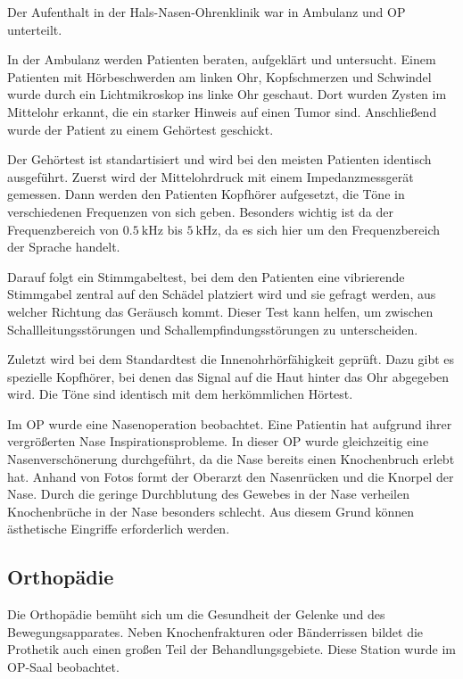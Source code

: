 \documentclass[11pt,a4paper,titlepage]{scrartcl}
\begin{document}
Der Aufenthalt in der Hals-Nasen-Ohrenklinik war in Ambulanz und OP unterteilt. \medskip

In der Ambulanz werden Patienten beraten, aufgeklärt und untersucht.
Einem Patienten mit Hörbeschwerden am linken Ohr, Kopfschmerzen und Schwindel wurde durch ein Lichtmikroskop ins linke Ohr geschaut.
Dort wurden Zysten im Mittelohr erkannt, die ein starker Hinweis auf einen Tumor sind.
Anschließend wurde der Patient zu einem Gehörtest geschickt. \medskip

Der Gehörtest ist standartisiert und wird bei den meisten Patienten identisch ausgeführt.
Zuerst wird der Mittelohrdruck mit einem Impedanzmessgerät gemessen.
Dann werden den Patienten Kopfhörer aufgesetzt, die Töne in verschiedenen Frequenzen von sich geben.
Besonders wichtig ist da der Frequenzbereich von $\SI{0,5}{\kilo\hertz}$ bis $\SI{5}{\kilo\hertz}$, da es sich hier um den Frequenzbereich der Sprache handelt. \medskip

Darauf folgt ein Stimmgabeltest, bei dem den Patienten eine vibrierende Stimmgabel zentral auf den Schädel platziert wird und sie gefragt werden, aus welcher Richtung das Geräusch kommt.
Dieser Test kann helfen, um zwischen Schallleitungsstörungen und Schallempfindungsstörungen zu unterscheiden. \medskip

Zuletzt wird bei dem Standardtest die Innenohrhörfähigkeit geprüft. Dazu gibt es spezielle Kopfhörer, bei denen das Signal auf die Haut hinter das Ohr abgegeben wird. Die Töne sind identisch mit dem herkömmlichen Hörtest. \medskip

Im OP wurde eine Nasenoperation beobachtet.
Eine Patientin hat aufgrund ihrer vergrößerten Nase Inspirationsprobleme.
In dieser OP wurde gleichzeitig eine Nasenverschönerung durchgeführt, da die Nase bereits einen Knochenbruch erlebt hat.
Anhand von Fotos formt der Oberarzt den Nasenrücken und die Knorpel der Nase.
Durch die geringe Durchblutung des Gewebes in der Nase verheilen Knochenbrüche in der Nase besonders schlecht.
Aus diesem Grund können ästhetische Eingriffe erforderlich werden. \medskip



\subsection{Orthopädie}

Die Orthopädie bemüht sich um die Gesundheit der Gelenke und des Bewegungsapparates.
Neben Knochenfrakturen oder Bänderrissen bildet die Prothetik auch einen großen Teil der Behandlungsgebiete.
Diese Station wurde im OP-Saal beobachtet. \medskip
\end{document}
